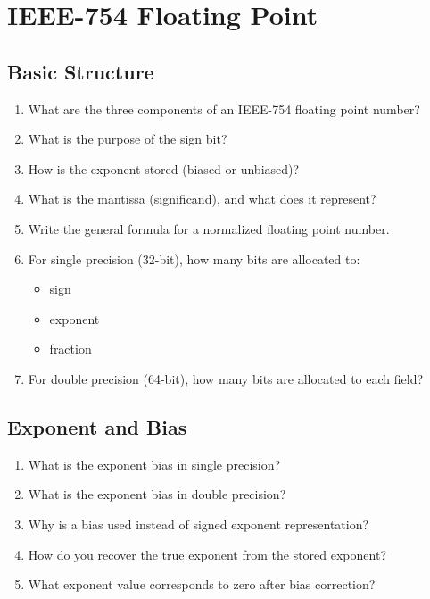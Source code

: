 \section{IEEE-754 Floating Point}

\subsection{Basic Structure}

\begin{enumerate}
\item What are the three components of an IEEE-754 floating point number?
\item What is the purpose of the sign bit?
\item How is the exponent stored (biased or unbiased)?
\item What is the mantissa (significand), and what does it represent?
\item Write the general formula for a normalized floating point number.

\item For single precision (32-bit), how many bits are allocated to:
\begin{itemize}
\item sign
\item exponent
\item fraction
\end{itemize}

\item For double precision (64-bit), how many bits are allocated to each field?
\end{enumerate}

\subsection{Exponent and Bias}

\begin{enumerate}
\item What is the exponent bias in single precision?
\item What is the exponent bias in double precision?
\item Why is a bias used instead of signed exponent representation?
\item How do you recover the true exponent from the stored exponent?
\item What exponent value corresponds to zero after bias correction?
\end{enumerate}

